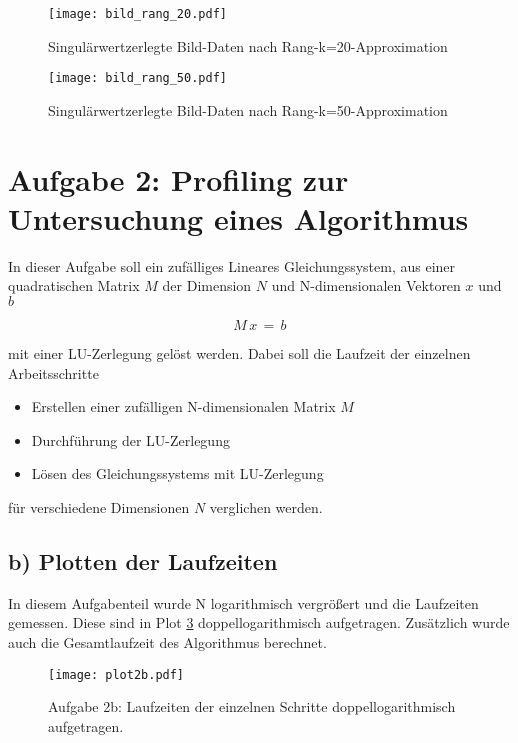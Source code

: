 \begin{figure}[h]
    \centering
    \texttt{[image: bild\_rang\_20.pdf]}
    \caption{Singulärwertzerlegte Bild-Daten nach Rang-k=20-Approximation}
    \label{fig:1b_20}
\end{figure}

\begin{figure}[h]
    \centering
    \texttt{[image: bild\_rang\_50.pdf]}
    \caption{Singulärwertzerlegte Bild-Daten nach Rang-k=50-Approximation}
    \label{fig:1b_50}
\end{figure}

\section*{Aufgabe 2: Profiling zur Untersuchung eines Algorithmus}
In dieser Aufgabe soll ein zufälliges Lineares Gleichungssystem, aus einer quadratischen Matrix $M$ der Dimension $N$ und N-dimensionalen Vektoren $x$ und $b$

\begin{equation*}
  M\, x\, =\, b
\end{equation*}

\noindent
mit einer LU-Zerlegung gelöst werden. Dabei soll die Laufzeit der einzelnen Arbeitsschritte

\begin{itemize}
  \item[1)] Erstellen einer zufälligen N-dimensionalen Matrix $M$
  \item[2)] Durchführung der LU-Zerlegung
  \item[3)] Lösen des Gleichungssystems mit LU-Zerlegung
\end{itemize}

\noindent
für verschiedene Dimensionen $N$ verglichen werden.

\subsection*{b) Plotten der Laufzeiten}
In diesem Aufgabenteil wurde N logarithmisch vergrößert und die Laufzeiten gemessen. Diese sind in Plot \ref{fig:plot2b} doppellogarithmisch aufgetragen. Zusätzlich wurde auch die Gesamtlaufzeit des Algorithmus berechnet.

\FloatBarrier
\begin{figure}[h]
    \centering
    \texttt{[image: plot2b.pdf]}
    \caption{Aufgabe 2b: Laufzeiten der einzelnen Schritte doppellogarithmisch aufgetragen.}
    \label{fig:plot2b}
\end{figure}
\FloatBarrier

